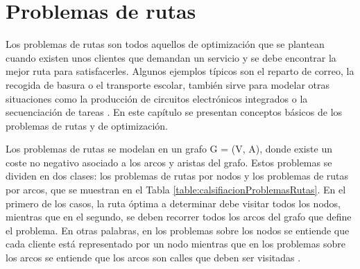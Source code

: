 \chapter{Problemas de rutas}
\label{chap4}
\ifpdf
  \graphicspath{{Chapter4/Chapter4Figs/PNG/}{Chapter4/Chapter4Figs/PDF/}{Chapter4/Chapter4Figs/}}
\else
  \graphicspath{{Chapter4/Chapter4Figs/EPS/}{Chapter4/Chapter4Figs/}}
\fi


Los problemas de rutas son todos aquellos de optimización que se plantean cuando existen unos clientes que demandan un servicio y se debe encontrar la mejor ruta para satisfacerles. Algunos ejemplos típicos son el reparto de correo, la recogida de basura o el transporte escolar, también sirve para modelar otras situaciones como la producción de circuitos electrónicos integrados o la secuenciación de tareas \citep{CalvinoM2011CooperacionPanoramica}. En este capítulo se presentan conceptos básicos de los problemas de rutas y de optimización.

Los problemas de rutas se modelan en un grafo G = (V, A), donde existe un coste no negativo asociado a los arcos y aristas del grafo. Estos problemas se dividen en dos clases: los problemas de rutas por nodos y los problemas de rutas por arcos, que se muestran en el Tabla \ref{table:calsifiacionProblemasRutas}. En el primero de los casos, la ruta óptima a determinar debe visitar todos los nodos, mientras que en el segundo, se deben recorrer todos los arcos del grafo que define el problema. En otras palabras, en los problemas sobre los nodos se entiende que cada cliente está representado por un nodo mientras que en los problemas sobre los arcos se entiende que los arcos son calles que deben ser visitadas \citep{CalvinoM2011CooperacionPanoramica}.

